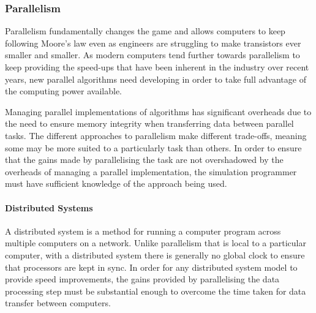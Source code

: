 \documentclass{UoYCSproject}
\begin{document}


\subsubsection{Parallelism}
Parallelism fundamentally changes the game and allows computers to keep following Moore's law even as engineers are struggling to make transistors ever smaller and smaller\cite{concurrency_revolution}.
As modern computers tend further towards parallelism to keep providing the speed-ups that have been inherent in the industry over recent years, new parallel algorithms need developing in order to take full advantage of the computing power available.

Managing parallel implementations of algorithms has significant overheads due to the need to ensure memory integrity when transferring data between parallel tasks.
The different approaches to parallelism make different trade-offs, meaning some may be more suited to a particularly task than others.
In order to ensure that the gains made by parallelising the task are not overshadowed by the overheads of managing a parallel implementation, the simulation programmer must have sufficient knowledge of the approach being used.

\paragraph{Distributed Systems}
A distributed system is a method for running a computer program across multiple computers on a network.
Unlike parallelism that is local to a particular computer, with a distributed system there is generally no global clock to ensure that processors are kept in sync.
In order for any distributed system model to provide speed improvements, the gains provided by parallelising the data processing step must be substantial enough to overcome the time taken for data transfer between computers.
\end{document}
